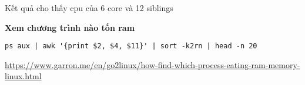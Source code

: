 Kết quả cho thấy cpu của 6 core và 12 siblings

\textbf{Xem chương trình nào tốn ram}


\begin{lstlisting}
ps aux | awk '{print $2, $4, $11}' | sort -k2rn | head -n 20
\end{lstlisting}

\href{https://www.garron.me/en/go2linux/how-find-which-process-eating-ram-memory-linux.html}{https://www.garron.me/en/go2linux/how-find-which-process-eating-ram-memory-linux.html}

